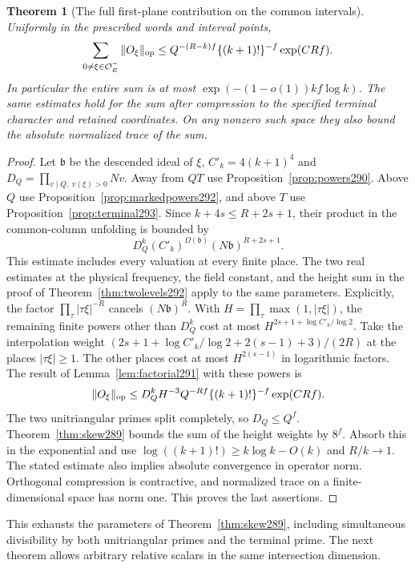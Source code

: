 \documentclass[a4paper,11pt]{article}
\newtheorem{theorem}[proposition]{Theorem}
\theoremstyle{definition}
\theoremstyle{remark}
\numberwithin{equation}{section}
\begin{document}
\begin{theorem}[The full first-plane contribution on the common intervals]\leavevmode
\label{thm:completeplane293}
Uniformly in the prescribed words and interval points,
\[
  \sum_{0\ne\xi\in\mathcal O_E^-}\|O_\xi\|_{\rm op}
    \le Q^{-(R-k)f}\{(k+1)!\}^{-f}\exp(CRf).
\]
In particular the entire sum is at most
\(\exp(-(1-o(1))kf\log k)\). The same estimates hold for
the sum after compression to the specified terminal
character and retained coordinates. On any nonzero such
space they also bound the absolute normalized trace of
the sum.
\end{theorem}
\begin{proof}
Let \(\mathfrak b\) be the descended ideal of \(\xi\),
\(C'_k=4(k+1)^4\) and
\(D_Q=\prod_{v\mid Q,\ v(\xi)>0}Nv\). Away from \(QT\)
use Proposition~\ref{prop:powers290}. Above \(Q\) use
Proposition~\ref{prop:markedpowers292}, and above \(T\)
use Proposition~\ref{prop:terminal293}. Since
\(k+4s\le R+2s+1\), their product in the common-column
unfolding is bounded by
\[
        D_Q^k(C'_k)^{\Omega(\mathfrak b)}
                      (N\mathfrak b)^{R+2s+1}.
\]
This estimate includes every valuation at every finite place.
The two real estimates at the physical frequency, the field constant,
and the height sum in the proof of Theorem~\ref{thm:twolevels292}
apply to the same parameters. Explicitly, the factor
\(\prod_\tau|\tau\xi|^{-R}\) cancels \((N\mathfrak b)^R\).
With \(H=\prod_\tau\max(1,|\tau\xi|)\), the remaining
finite powers other than \(D_Q^k\) cost at most
\(H^{2s+1+\log C'_k/\log 2}\). Take the interpolation
weight \((2s+1+\log C'_k/\log 2+2(s-1)+3)/(2R)\)
at the places \(|\tau\xi|\ge1\). The other places cost
at most \(H^{2(s-1)}\) in logarithmic factors. The
result of Lemma~\ref{lem:factorial291} with these powers is
\[
  \|O_\xi\|_{\rm op}\le
       D_Q^k H^{-3}Q^{-Rf}\{(k+1)!\}^{-f}\exp(CRf).
\]
The two unitriangular primes split completely, so
\(D_Q\le Q^f\). Theorem~\ref{thm:skew289} bounds the
sum of the height weights by \(8^f\). Absorb this in the
exponential and use
\(\log((k+1)!)\ge k\log k-O(k)\) and \(R/k\to1\).
The stated estimate also implies absolute convergence
in operator norm. Orthogonal compression is contractive,
and normalized trace on a finite-dimensional space has
norm one. This proves the last assertions.
\end{proof}

This exhausts the parameters of Theorem~\ref{thm:skew289}, including simultaneous divisibility by both unitriangular primes and the terminal prime. The next theorem allows arbitrary relative scalars in the same intersection dimension.
\end{document}
